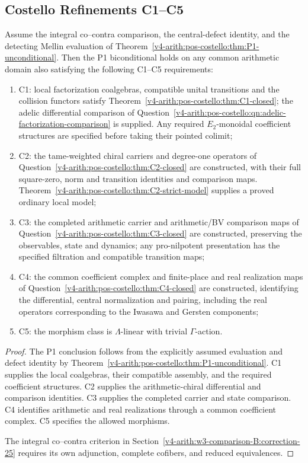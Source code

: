 \subsection{Costello Refinements C1--C5}
\label{v4-arith:w3-comparison-B:correction-34}

\begin{proposition}
Assume the integral co--contra comparison, the central-defect
identity, and the detecting Mellin evaluation of
Theorem~\ref{v4-arith:pos-costello:thm:P1-unconditional}.
Then the P1 biconditional holds on any common arithmetic domain
also satisfying the following C1--C5 requirements:
\begin{enumerate}
\item C1: local factorization coalgebras, compatible unital
transitions and the collision functors satisfy
Theorem~\ref{v4-arith:pos-costello:thm:C1-closed}; the adelic
differential comparison of
Question~\ref{v4-arith:pos-costello:qn:adelic-factorization-comparison}
is supplied. Any required \(E_2\)-monoidal coefficient structures
are specified before taking their pointed colimit;
\item C2: the tame-weighted chiral carriers and degree-one operators of
Question~\ref{v4-arith:pos-costello:thm:C2-closed} are constructed,
with their full square-zero, norm and transition identities and
comparison maps. Theorem~\ref{v4-arith:pos-costello:thm:C2-strict-model}
supplies a proved ordinary local model;
\item C3: the completed arithmetic carrier and arithmetic/BV
comparison maps of Question~\ref{v4-arith:pos-costello:thm:C3-closed}
are constructed, preserving the observables, state and dynamics;
any pro-nilpotent presentation has the specified filtration and
compatible transition maps;
\item C4: the common coefficient complex and finite-place and real
realization maps of Question~\ref{v4-arith:pos-costello:thm:C4-closed}
are constructed, identifying the differential, central normalization
and pairing, including the real operators corresponding to the
Iwasawa and Gersten components;
\item C5: the morphism class is \(\Lambda\)-linear with trivial
\(\Gamma\)-action.
\end{enumerate}
\end{proposition}

\begin{proof}
The P1 conclusion follows from the explicitly assumed evaluation
and defect identity by
Theorem~\ref{v4-arith:pos-costello:thm:P1-unconditional}.
C1 supplies the local coalgebras, their compatible assembly, and
the required coefficient structures. C2 supplies the arithmetic-chiral
differential and comparison identities. C3 supplies the completed
carrier and state comparison. C4 identifies arithmetic and real
realizations through a common coefficient complex. C5 specifies
the allowed morphisms.

The integral co--contra criterion in
Section~\ref{v4-arith:w3-comparison-B:correction-25} requires
its own adjunction, complete cofibers, and reduced equivalences.
\end{proof}

